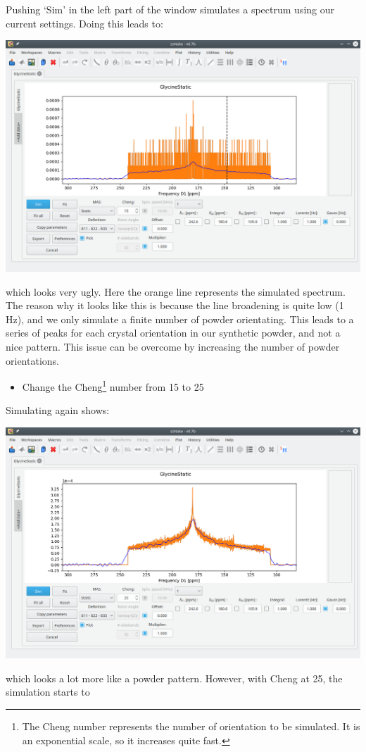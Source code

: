 \documentclass[11pt,a4paper]{article}
\begin{document}
Pushing `Sim' in the left part of the window simulates a spectrum using our current settings. Doing
this leads to:
\begin{center}
\includegraphics[width=0.8\linewidth]{Figs/Fig3.png}
\end{center}
which looks very ugly. Here the orange line represents the simulated spectrum. The reason why it
looks like this is because the line broadening is quite low (1 Hz), and we only simulate a finite number
of powder orientating. This leads to a series of peaks for each crystal orientation in our synthetic
powder, and not a nice pattern. This issue can be overcome by increasing the number of powder
orientations.
\begin{itemize}
  \item Change the Cheng\footnote{The Cheng number represents the number of orientation to be
	 simulated. It is an exponential scale, so it increases quite fast.} number from 15 to 25
\end{itemize}
Simulating again shows:
\begin{center}
\includegraphics[width=0.8\linewidth]{Figs/Fig4.png}
\end{center}
which looks a lot more like a powder pattern. However, with Cheng at 25, the simulation starts to
\end{document}
